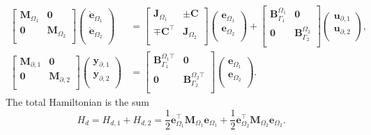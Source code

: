 \begin{equation}\label{eq:pHfindim_intOm12}
\begin{aligned}
\begin{bmatrix}
\mathbf{M}_{\Omega_1} & \mathbf{0} \\
\mathbf{0} & \mathbf{M}_{\Omega_2} \\
\end{bmatrix}
\begin{pmatrix}
\dot{\mathbf{e}}_{\Omega_1} \\
\dot{\mathbf{e}}_{\Omega_2} \\
\end{pmatrix}
&= \begin{bmatrix}
\mathbf{J}_{\Omega_1} & \pm \mathbf{C}\\
\mp \mathbf{C}^\top & \mathbf{J}_{\Omega_2} \\
\end{bmatrix} 
\begin{pmatrix}
{\mathbf{e}}_{\Omega_1} \\
{\mathbf{e}}_{\Omega_2} \\
\end{pmatrix} + 
\begin{bmatrix}
\mathbf{B}_{\Gamma_1}^{\Omega_1} & \mathbf{0}\\
\mathbf{0} & \mathbf{B}_{\Gamma_2}^{\Omega_2}\\
\end{bmatrix}
\begin{pmatrix}
\mathbf{u}_{\partial, 1} \\
\mathbf{u}_{\partial, 2}\\
\end{pmatrix}, \\
\begin{bmatrix}
\mathbf{M}_{\partial, 1} & \mathbf{0}  \\
\mathbf{0} & \mathbf{M}_{\partial, 2} \\
\end{bmatrix}
\begin{pmatrix}
\mathbf{y}_{\partial, 1} \\
\mathbf{y}_{\partial, 2} \\
\end{pmatrix}
&= 
\begin{bmatrix}
\mathbf{B}_{\Gamma_1}^{\Omega_1 \top} & \mathbf{0} \\
\mathbf{0} & \mathbf{B}_{\Gamma_2}^{\Omega_2 \top} \\
\end{bmatrix}\begin{pmatrix}
{\mathbf{e}}_{\Omega_1} \\
{\mathbf{e}}_{\Omega_2} \\
\end{pmatrix}.
\end{aligned}
\end{equation}
The total Hamiltonian is the sum 
\begin{equation}
H_d = H_{d, 1} + H_{d, 2} = \frac{1}{2} {\mathbf{e}}_{\Omega_1}^\top \mathbf{M}_{\Omega_1}
{\mathbf{e}}_{\Omega_1} + \frac{1}{2} {\mathbf{e}}_{\Omega_2}^\top \mathbf{M}_{\Omega_2}
{\mathbf{e}}_{\Omega_2}.
\end{equation}

